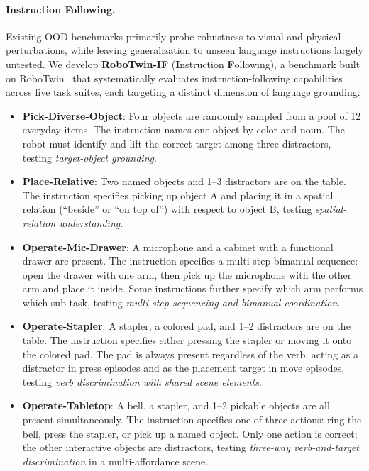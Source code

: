 \paragraph{Instruction Following.}
Existing OOD benchmarks primarily probe robustness to visual and physical perturbations, while leaving generalization to unseen language instructions largely untested. We develop \textbf{RoboTwin-IF} (\textbf{I}nstruction \textbf{F}ollowing), a benchmark built on RoboTwin~\citep{mu2025robotwin} that systematically evaluates instruction-following capabilities across five task suites, each targeting a distinct dimension of language grounding:
%
\begin{itemize}[leftmargin=*,topsep=2pt,itemsep=1pt]
    \item \textbf{Pick-Diverse-Object}: Four objects are randomly sampled from a pool of 12 everyday items. The instruction names one object by color and noun. The robot must identify and lift the correct target among three distractors, testing \emph{target-object grounding}.
    \item \textbf{Place-Relative}: Two named objects and 1--3 distractors are on the table. The instruction specifies picking up object A and placing it in a spatial relation (``beside'' or ``on top of'') with respect to object B, testing \emph{spatial-relation understanding}.
    \item \textbf{Operate-Mic-Drawer}: A microphone and a cabinet with a functional drawer are present. The instruction specifies a multi-step bimanual sequence: open the drawer with one arm, then pick up the microphone with the other arm and place it inside. Some instructions further specify which arm performs which sub-task, testing \emph{multi-step sequencing and bimanual coordination}.
    \item \textbf{Operate-Stapler}: A stapler, a colored pad, and 1--2 distractors are on the table. The instruction specifies either pressing the stapler or moving it onto the colored pad. The pad is always present regardless of the verb, acting as a distractor in press episodes and as the placement target in move episodes, testing \emph{verb discrimination with shared scene elements}.
    \item \textbf{Operate-Tabletop}: A bell, a stapler, and 1--2 pickable objects are all present simultaneously. The instruction specifies one of three actions: ring the bell, press the stapler, or pick up a named object. Only one action is correct; the other interactive objects are distractors, testing \emph{three-way verb-and-target discrimination} in a multi-affordance scene.
\end{itemize}

